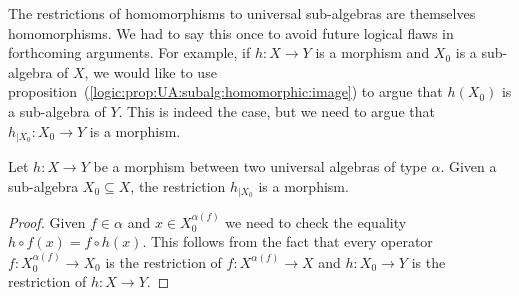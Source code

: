 The restrictions of homomorphisms to universal sub-algebras are
themselves homomorphisms. We had to say this once to avoid future logical flaws
in forthcoming arguments. For example, if $h:X\to Y$ is a morphism
and $X_{0}$ is a sub-algebra of $X$, we would like to use
proposition~(\ref{logic:prop:UA:subalg:homomorphic:image}) to argue
that $h(X_{0})$ is a sub-algebra of $Y$. This is indeed the case,
but we need to argue that $h_{|X_{0}}:X_{0}\to Y$ is a morphism.

\begin{prop}\label{logic:prop:UA:subalg:restriction:morphism}
Let $h:X\to Y$ be a morphism  between two universal algebras of type
$\alpha$. Given a sub-algebra $X_{0}\subseteq X$, the restriction
$h_{|X_{0}}$ is a morphism.
\end{prop}
\begin{proof}
Given $f\in\alpha$ and $x\in X_{0}^{\alpha(f)}$ we need to check the
equality $h\circ f(x)=f\circ h(x)$. This follows from the fact that
every operator $f:X_{0}^{\alpha(f)}\to X_{0}$ is the restriction of
$f:X^{\alpha(f)}\to X$ and $h:X_{0}\to Y$ is the restriction of
$h:X\to Y$.
\end{proof}


